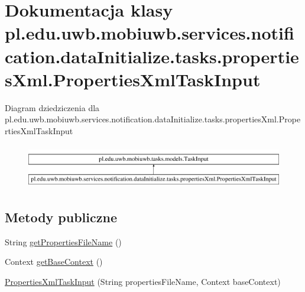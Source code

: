 \hypertarget{classpl_1_1edu_1_1uwb_1_1mobiuwb_1_1services_1_1notification_1_1data_initialize_1_1tasks_1_1prop03c373be1435a0ef0a4271d3f7959d57}{}\section{Dokumentacja klasy pl.\+edu.\+uwb.\+mobiuwb.\+services.\+notification.\+data\+Initialize.\+tasks.\+properties\+Xml.\+Properties\+Xml\+Task\+Input}
\label{classpl_1_1edu_1_1uwb_1_1mobiuwb_1_1services_1_1notification_1_1data_initialize_1_1tasks_1_1prop03c373be1435a0ef0a4271d3f7959d57}
Diagram dziedziczenia dla pl.\+edu.\+uwb.\+mobiuwb.\+services.\+notification.\+data\+Initialize.\+tasks.\+properties\+Xml.\+Properties\+Xml\+Task\+Input\begin{figure}[H]
\begin{center}
\leavevmode
\includegraphics[height=1.947826cm]{classpl_1_1edu_1_1uwb_1_1mobiuwb_1_1services_1_1notification_1_1data_initialize_1_1tasks_1_1prop03c373be1435a0ef0a4271d3f7959d57}
\end{center}
\end{figure}
\subsection*{Metody publiczne}
\begin{DoxyCompactItemize}
\item 
String \hyperlink{classpl_1_1edu_1_1uwb_1_1mobiuwb_1_1services_1_1notification_1_1data_initialize_1_1tasks_1_1prop03c373be1435a0ef0a4271d3f7959d57_afe8c348cf10b298a35c86121cae9d31e}{get\+Properties\+File\+Name} ()
\item 
Context \hyperlink{classpl_1_1edu_1_1uwb_1_1mobiuwb_1_1services_1_1notification_1_1data_initialize_1_1tasks_1_1prop03c373be1435a0ef0a4271d3f7959d57_ae26316fd4f1b050d0b3b9e504ac25ffe}{get\+Base\+Context} ()
\item 
\hyperlink{classpl_1_1edu_1_1uwb_1_1mobiuwb_1_1services_1_1notification_1_1data_initialize_1_1tasks_1_1prop03c373be1435a0ef0a4271d3f7959d57_a05dbc622ba63b4f749749b3466b07887}{Properties\+Xml\+Task\+Input} (String properties\+File\+Name, Context base\+Context)
\end{DoxyCompactItemize}


